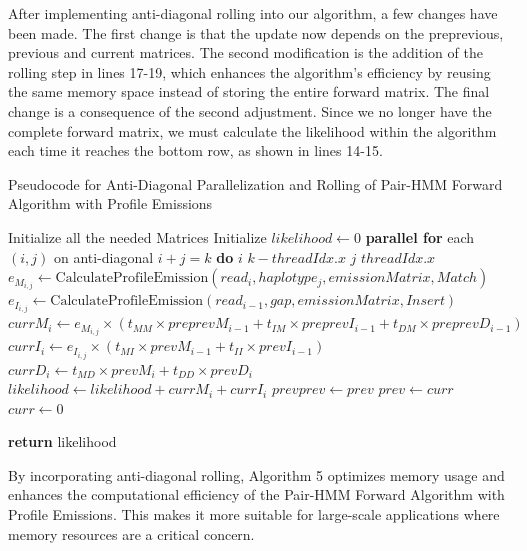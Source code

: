 \documentclass[PhD]{PHlab-thesis}
\begin{document}
After implementing anti-diagonal rolling into our algorithm, a few changes have been made. The first change is that the update now depends on the preprevious, previous and current matrices. The second modification is the addition of the rolling step in lines 17-19, which enhances the algorithm's efficiency by reusing the same memory space instead of storing the entire forward matrix. The final change is a consequence of the second adjustment. Since we no longer have the complete forward matrix, we must calculate the likelihood within the algorithm each time it reaches the bottom row, as shown in lines 14-15.
\newpage
\begin{algorithm}[h]
\caption{Pseudocode for Anti-Diagonal Parallelization and Rolling of Pair-HMM Forward Algorithm with Profile Emissions}
\begin{algorithmic}[1]
\State Initialize all the needed Matrices
\State Initialize $likelihood \gets0$
    \State \textbf{parallel for} each $(i, j)$ on anti-diagonal $i+j=k$ \textbf{do}
    \State $i$ \gets $k - threadIdx.x$
    \State $j$ \gets $threadIdx.x$
        \State $e_{M_{i,j}} \gets \text{CalculateProfileEmission}(read_i, haplotype_j, emissionMatrix, Match)$
        \State $e_{I_{i,j}} \gets \text{CalculateProfileEmission}(read_{i-1}, gap, emissionMatrix, Insert)$
        \State $currM_{i} \gets e_{M_{i,j}} \times (t_{MM} \times preprevM_{i-1} + t_{IM} \times preprevI_{i-1} + t_{DM} \times preprevD_{i-1})$
        \State $currI_{i} \gets e_{I_{i,j}} \times (t_{MI} \times prevM_{i-1} + t_{II} \times prevI_{i-1})$
        \State $currD_{i} \gets t_{MD} \times prevM_{i} + t_{DD} \times prevD_{i}$
    \EndIf
        \State $likelihood \gets likelihood + currM_{i} + currI_{i}$
    \EndIf
\State $prevprev \gets prev$
\State $prev \gets curr$
\State $curr \gets 0$

\EndFor
\State \textbf{return }likelihood
\EndProcedure
\end{algorithmic}
\end{algorithm}

By incorporating anti-diagonal rolling, Algorithm 5 optimizes memory usage and enhances the computational efficiency of the Pair-HMM Forward Algorithm with Profile Emissions. This makes it more suitable for large-scale applications where memory resources are a critical concern.
\end{document}
